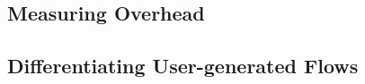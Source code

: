 
\subsection{Measuring Overhead}
\label{sec:measuring-overhead}


\subsection{Differentiating User-generated Flows}
\label{sec:differentiating-user-generated-flows}


\newpage
